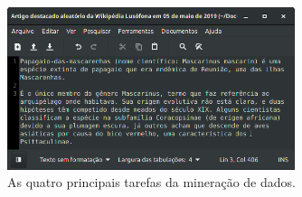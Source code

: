 \begin{figure}[h]
    \centering
    \caption{As quatro principais tarefas da mineração de dados.}
    \begin{center}
        \includegraphics[width=0.75\textwidth]{img/exemplo-texto-simples.png}
    \end{center}
    \vspace{-0.5cm}
    \label{fig:tarefas-principais-mineração-dados}
\end{figure}

